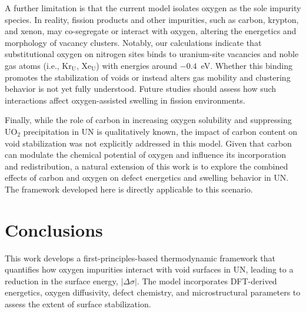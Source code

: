 \documentclass[preprint,12pt,sort&compress]{elsarticle}
\newcommand{\?}{\stackrel{?}{=}}
\begin{document}
A further limitation is that the current model isolates oxygen as the sole impurity species. In reality, fission products and other impurities, such as carbon, krypton, and xenon, may co-segregate or interact with oxygen, altering the energetics and morphology of vacancy clusters. Notably, our calculations indicate that substitutional oxygen on nitrogen sites binds to uranium-site vacancies and noble gas atoms (i.e., Kr$_\text{U}$, Xe$_\text{U}$) with energies around $-0.4$~eV. Whether this binding promotes the stabilization of voids or instead alters gas mobility and clustering behavior is not yet fully understood. Future studies should assess how such interactions affect oxygen-assisted swelling in fission environments.

Finally, while the role of carbon in increasing oxygen solubility and suppressing UO$_2$ precipitation in UN is qualitatively known, the impact of carbon content on void stabilization was not explicitly addressed in this model. Given that carbon can modulate the chemical potential of oxygen and influence its incorporation and redistribution, a natural extension of this work is to explore the combined effects of carbon and oxygen on defect energetics and swelling behavior in UN. The framework developed here is directly applicable to this scenario.

\section{Conclusions}

This work develops a first-principles-based thermodynamic framework that quantifies how oxygen impurities interact with void surfaces in UN, leading to a reduction in the surface energy, $|\Delta \sigma|$. The model incorporates DFT-derived energetics, oxygen diffusivity, defect chemistry, and microstructural parameters to assess the extent of surface stabilization.
\end{document}
